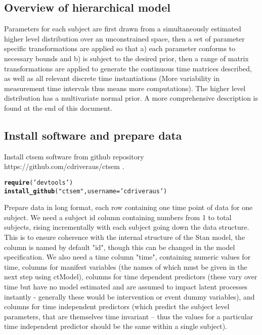 \documentclass[nojss]{jss}\usepackage[]{graphicx}\usepackage[]{color}
\makeatletter
\newcommand{\hlstr}[1]{\textcolor[rgb]{0.192,0.494,0.8}{#1}}%
\newcommand{\hlstd}[1]{\textcolor[rgb]{0.345,0.345,0.345}{#1}}%
\newcommand{\hlkwc}[1]{\textcolor[rgb]{0.333,0.667,0.333}{#1}}%
\newcommand{\hlkwd}[1]{\textcolor[rgb]{0.737,0.353,0.396}{\textbf{#1}}}%
\newenvironment{kframe}{%
 \def\at@end@of@kframe{}%
 \ifinner\ifhmode%
  \def\at@end@of@kframe{\end{minipage}}%
  \begin{minipage}{\columnwidth}%
 \fi\fi%
 \def\FrameCommand##1{\hskip\@totalleftmargin \hskip-\fboxsep
 \colorbox{shadecolor}{##1}\hskip-\fboxsep
     \hskip-\linewidth \hskip-\@totalleftmargin \hskip\columnwidth}%
 \MakeFramed {\advance\hsize-\width
   \@totalleftmargin\z@ \linewidth\hsize
   \@setminipage}}%
 {\par\unskip\endMakeFramed%
 \at@end@of@kframe}
\newenvironment{knitrout}{}{} %
\makeatother
\begin{document}
\subsection{Overview of hierarchical model}
Parameters for each subject are first drawn from a simultaneously estimated higher level distribution over an unconstrained space, then a set of parameter specific transformations are applied so that a) each parameter conforms to necessary bounds and b) is subject to the desired prior, then a range of matrix transformations are applied to generate the continuous time matrices described, as well as all relevant discrete time instantiations (More variability in measurement time intervals thus means more computations). The higher level distribution has a multivariate normal prior. A more comprehensive description is found at the end of this document. 

\subsection{Install software and prepare data}
Install ctsem software from github repository https://github.com/cdriveraus/ctsem .

\begin{knitrout}\small
{}\color{fgcolor}\begin{kframe}
\begin{alltt}
\hlkwd{require}\hlstd{(}\hlstr{'devtools'}\hlstd{)}
\hlkwd{install_github}\hlstd{(}\hlstr{"ctsem"}\hlstd{,}\hlkwc{username}\hlstd{=}\hlstr{'cdriveraus'}\hlstd{)}
\end{alltt}
\end{kframe}
\end{knitrout}

Prepare data in long format, each row containing one time point of data for one subject. We need a subject id column containing numbers from 1 to total subjects, rising incrementally with each subject going down the data structure. This is to ensure coherence with the internal structure of the Stan model, the column is named by default "id", though this can be changed in the model specification. We also need a time column "time", containing numeric values for time, columns for manifest variables (the names of which must be given in the next step using ctModel), columns for time dependent predictors (these vary over time but have no model estimated and are assumed to impact latent processes instantly - generally these would be intervention or event dummy variables), and columns for time independent predictors (which predict the subject level parameters, that are themselves time invariant -- thus the values for a particular time independent predictor should be the same within a single subject).
\end{document}
